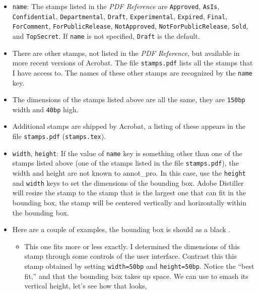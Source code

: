 \documentclass[12pt]{article}
\begin{document}
\begin{itemize}

\begingroup\raggedright

    \item \texttt{name}: The stamps listed in the \textsl{PDF
    Reference} are \texttt{Approved}, \texttt{AsIs},
    \texttt{Confidential}, \texttt{Departmental}, \texttt{Draft},
    \texttt{Experimental}, \texttt{Expired}, \texttt{Final},
    \texttt{ForComment}, \texttt{ForPublicRelease},
    \texttt{NotApproved}, \texttt{NotForPublicRelease},
    \texttt{Sold}, and \texttt{TopSecret}. If \texttt{name}
    is not specified, \texttt{Draft} is the default.\par\endgroup

    \item[] There are other stamps, not listed in the \textsl{PDF
    Reference}, but available in more recent versions of Acrobat.
    The file \texttt{stamps.pdf} lists all the stamps that I have
    access to. The names of these other stamps are recognized by the
    \texttt{name} key.

    \item[] The dimensions of the stamps listed above are all the
    same, they are \texttt{150bp} width and \texttt{40bp} high.

    \item[] Additional stamps are shipped by Acrobat, a listing of these
    appears in the file \texttt{stamps.pdf} (\texttt{stamps.tex}).

    \item\texttt{width}, \texttt{height}: If the value of
    \texttt{name} key is something other than one of the stamps
    listed above (one of the stamps listed in the file
    \texttt{stamps.pdf}), the width and height are not known to
    \textsf{annot\_pro}. In this case, use the \texttt{height} and \texttt{width} keys
    to set the dimensions of the bounding box. Adobe Distiller will
    resize the stamp to the stamp that is the largest one that can fit in
    the bounding box, the stamp will be centered vertically and
    horizontally within the bounding box.

    \item[] Here are a couple of examples, the bounding box is should as a black .

\begin{itemize}

\previewtrue

        \item This one 
        fits more or less exactly.  I determined the dimensions of this stamp through some controls of the user interface.
        Contrast this this stamp
        obtained by setting \texttt{width=50bp} and \texttt{height=50bp}. Notice the ``best fit,'' and that the bounding
        box takes up space. We can use  to smash its vertical height, let's see how that looks,


\end{itemize}
\end{itemize}
\end{document}
